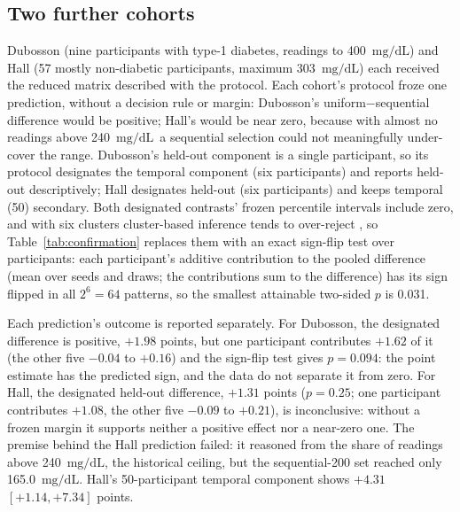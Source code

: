 \documentclass[10pt,twocolumn]{article}
\newcommand{\mgdl}{\ensuremath{\mathrm{mg/dL}}}
\begin{document}
\subsection{Two further cohorts}

Dubosson (nine participants with type-1 diabetes, readings to 400~\mgdl)
and Hall (57 mostly non-diabetic participants, maximum 303~\mgdl) each
received the reduced matrix described with the protocol. Each cohort's
protocol froze one prediction, without a decision rule or margin:
Dubosson's uniform$-$sequential difference would be positive; Hall's
would be near zero, because with almost no readings above 240~\mgdl\ a
sequential selection could not meaningfully under-cover the range.
Dubosson's held-out component is a single participant, so its protocol
designates the temporal component (six participants) and reports held-out
descriptively; Hall designates held-out (six participants) and keeps
temporal (50) secondary. Both designated contrasts' frozen percentile
intervals include zero, and with six clusters cluster-based inference
tends to over-reject \cite{cameron2008bootstrap}, so
Table~\ref{tab:confirmation}
replaces them with an exact sign-flip test over
participants: each participant's additive contribution to the pooled
difference (mean over seeds and draws; the contributions sum to the
difference) has its sign flipped in all $2^6=64$ patterns, so the smallest
attainable two-sided $p$ is 0.031.

Each prediction's outcome is reported separately. For Dubosson, the
designated difference is positive, $+1.98$ points, but one participant
contributes $+1.62$ of it (the other five $-0.04$ to $+0.16$) and the
sign-flip test gives $p=0.094$: the point estimate has the predicted sign,
and the data do not separate it from zero. For Hall, the designated
held-out difference, $+1.31$ points ($p=0.25$; one participant contributes
$+1.08$, the other five $-0.09$ to $+0.21$), is inconclusive: without a
frozen margin it supports neither a positive effect nor a near-zero one. The premise behind the Hall
prediction failed: it reasoned from the share of readings above
240~\mgdl, the historical ceiling, but the sequential-200 set reached only
165.0~\mgdl. Hall's 50-participant temporal component shows $+4.31$
$[+1.14, +7.34]$ points.
\end{document}
